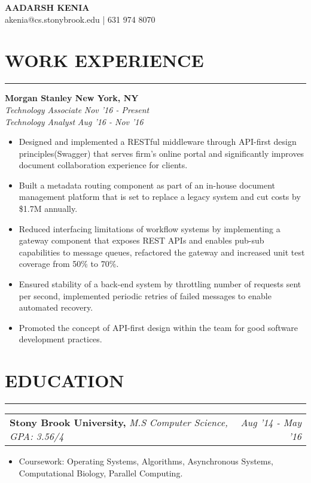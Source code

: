 \documentclass[12pt]{article}
\makeatletter
\newcommand{\sectionHeading}[1]{
\section*{\small{#1}}
\vspace{-8pt}
\hrule
\vspace{8pt}
}
\newcommand{\experienceSectionSubheadingAlternate}[6]{
  \vspace{-1pt}
    \small{\textbf{Morgan Stanley \hfill New York, NY}} \\
    \small{\textit{#3} \hfill \textit{#4}} \\
    \small{\textit{#5} \hfill \textit{#6}} \\
    \vspace{-15pt}
}
\newcommand{\educationSectionSubheading}[3]{
    \vspace{-1pt}
    \noindent \begin{tabular*}{1.01\linewidth}{l@{\extracolsep{\fill}}r}
      \small{\textbf{#1, }\textit{#2}} & \small{\textit{#3}} \\
    \end{tabular*}\vspace{-8pt}
}
\newcommand{\sectionListStart}{\begin{itemize}[label={\small{\textbullet}},noitemsep]}
\newcommand{\sectionListEnd}{\end{itemize}}
\newcommand{\sectionListItem}[1]{\item \small{#1}}
\makeatother
\begin{document}
\begin{center}
\LARGE{\textbf{AADARSH KENIA}}\\
\vspace{4pt}
\small{\Letter \hspace{1mm}akenia@cs.stonybrook.edu} | \Telefon \hspace{1mm}631 974 8070
\end{center}

\sectionHeading{WORK EXPERIENCE}
\experienceSectionSubheadingAlternate
{Morgan Stanley}{New York, NY}
{Technology Associate}{Nov '16 - Present}
{Technology Analyst}{Aug '16 - Nov '16}
\sectionListStart
    \sectionListItem
        Designed and implemented a RESTful middleware through API-first design principles(Swagger) that serves firm's online portal and significantly improves document collaboration experience for clients.
    \sectionListItem
        Built a metadata routing component as part of an in-house document management platform that is set to replace a legacy system and cut costs by \$1.7M annually.
    \sectionListItem
        Reduced interfacing limitations of workflow systems by implementing a gateway component that exposes REST APIs  and enables pub-sub capabilities to message queues, refactored the gateway and increased unit test coverage from 50\% to 70\%. 
    \sectionListItem
        Ensured stability of a back-end system by throttling number of requests sent per second, implemented periodic retries of failed messages to enable automated recovery.
    \sectionListItem
        Promoted the concept of API-first design within the team for good software development practices.
\sectionListEnd


\sectionHeading{EDUCATION}
\educationSectionSubheading
{Stony Brook  University}{M.S Computer Science, GPA: 3.56/4}{Aug '14 - May '16}
\sectionListStart
    \sectionListItem
        Coursework: Operating Systems, Algorithms, Asynchronous Systems, Computational Biology, Parallel Computing. 
\sectionListEnd
\end{document}
